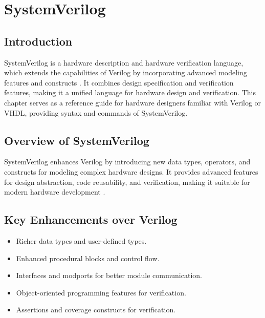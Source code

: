 \section{SystemVerilog}

\subsection{Introduction}
SystemVerilog is a hardware description and hardware verification language, which extends the capabilities of Verilog by incorporating advanced modeling features and constructs \cite{ieee1800-2017}. It combines design specification and verification features, making it a unified language for hardware design and verification. This chapter serves as a reference guide for hardware designers familiar with Verilog or VHDL, providing syntax and commands of SystemVerilog.

\subsection{Overview of SystemVerilog}
SystemVerilog enhances Verilog by introducing new data types, operators, and constructs for modeling complex hardware designs. It provides advanced features for design abstraction, code reusability, and verification, making it suitable for modern hardware development \cite{baker2010systemverilog}.

\subsection{Key Enhancements over Verilog}
\begin{itemize}
    \item Richer data types and user-defined types.
    \item Enhanced procedural blocks and control flow.
    \item Interfaces and modports for better module communication.
    \item Object-oriented programming features for verification.
    \item Assertions and coverage constructs for verification.
\end{itemize}

